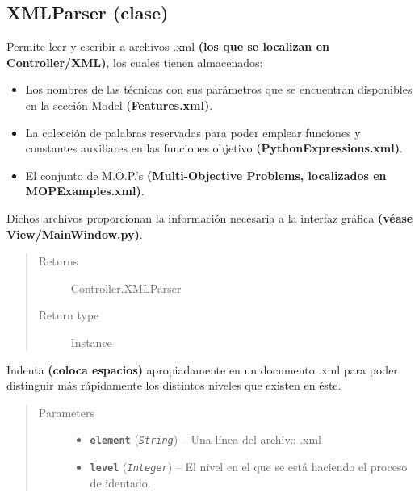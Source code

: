 \documentclass[class=report, crop=false]{standalone}
\begin{document}
\subsection{XMLParser (clase)}
\label{sec:a_4_2}
\begin{fulllineitems}

\begin{DUlineblock}{0em}
\item[] Permite leer y escribir a archivos .xml 
\textbf{(los que se localizan en Controller/XML)}, los cuales tienen 
almacenados: 

\begin{itemize}
\item Los nombres de las técnicas con sus parámetros que se encuentran 
disponibles en la sección Model \textbf{(Features.xml)}.
\item La colección de palabras reservadas para poder emplear funciones y 
constantes auxiliares en las funciones objetivo \break\textbf{(PythonExpressions.xml)}.
\item El conjunto de M.O.P.'s \textbf{(Multi-Objective Problems, localizados en MOPExamples.xml)}.
\end{itemize}

Dichos archivos proporcionan la información necesaria a la interfaz 
gráfica \textbf{(véase View/MainWindow.py)}.
\end{DUlineblock}

\begin{quote}\begin{description}
\item[{Returns}] \leavevmode
Controller.XMLParser
\item[{Return type}] \leavevmode
Instance
\end{description}\end{quote}


\begin{fulllineitems}

Indenta \textbf{(coloca espacios)} apropiadamente
en un documento .xml para poder distinguir más
rápidamente los distintos niveles que existen en éste.

\begin{quote}\begin{description}
\item[{Parameters}] \leavevmode\begin{itemize}
\item \textbf{\texttt{element}} (\emph{\texttt{String}}) -- Una línea del archivo .xml
\item \textbf{\texttt{level}} (\emph{\texttt{Integer}}) -- El nivel en el que se está haciendo el proceso de identado.
\end{itemize}
\end{description}\end{quote}


\end{fulllineitems}
\end{fulllineitems}
\end{document}
